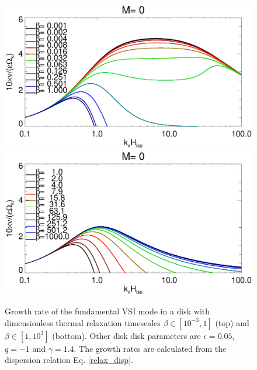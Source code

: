 \begin{figure}
  \includegraphics[width=\linewidth,clip=true,trim=0cm 1.75cm 0cm 0cm]{figures/rate_theory_grow_relax}
  \includegraphics[width=\linewidth,clip=true,trim=0cm 0cm 0cm 1cm]{figures/rate_theory_grow_relax2}
  \caption{Growth rate of the fundamental VSI mode in a disk with
    dimensionless thermal relaxation timescales
    $\beta\in[10^{-3},1]$ (top) and $\beta\in[1,10^3]$ (bottom).
Other disk disk parameters are
    $\epsilon=0.05$, $q=-1$ and $\gamma=1.4$. The growth rates are
    calculated from the dispersion relation Eq. \ref{relax_disp}. 
    \label{relax_disp_fig}}  
\end{figure}   

